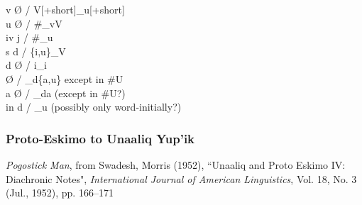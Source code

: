 \documentclass[11pt]{article}
\begin{document}
v \textrightarrow\hspace{0pt} \O\hspace{0pt} / V[+short]_u[+short] \\
u \textrightarrow\hspace{0pt} \O\hspace{0pt} / \#_vV \\
iv \textrightarrow\hspace{0pt} j / \#_u \\
s \textrightarrow\hspace{0pt} d / \{i,u\}_V \\
d \textrightarrow\hspace{0pt} \O\hspace{0pt} / i_i \\
 \textrightarrow\hspace{0pt} \O\hspace{0pt} / _d\{a,u\} except in \#U \\
a \textrightarrow\hspace{0pt} \O\hspace{0pt} / _da (except in \#U?) \\
in \textrightarrow\hspace{0pt} d / _u (possibly only word-initially?)

\subsubsection{Proto-Eskimo to Unaaliq Yup'ik}{\it Pogostick Man}, from Swadesh, Morris (1952), \textquotedblleft Unaaliq and Proto Eskimo IV: Diachronic Notes", \textit{International Journal of American Linguistics}, Vol. 18, No. 3 (Jul., 1952), pp. 166--171
\end{document}
